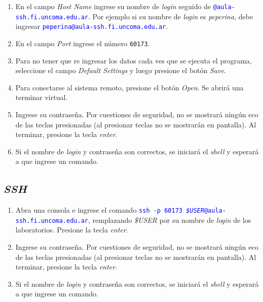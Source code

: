 \documentclass[12pt]{article}
\newcommand{\cw}[1]{\texttt{\textcolor{blue}{#1}}}
\begin{document}
\begin{enumerate}
\begin{figure}[!htb]
\end{figure}


    \item En el campo \emph{Host Name} ingrese su nombre de \emph{login}
        seguido de \cw{@aula-ssh.fi.uncoma.edu.ar}. Por ejemplo si su nombre
        de \emph{login} es \emph{peperina}, debe ingresar
        \cw{peperina@aula-ssh.fi.uncoma.edu.ar}.

    \item En el campo \emph{Port} ingrese el número \texttt{60173}.

    \item Para no tener que re ingresar los datos cada ves que se ejecuta el
        programa, seleccione el campo \emph{Default Settings} y luego presione
        el botón \emph{Save}.

    \item Para conectarse al sistema remoto, presione el botón \emph{Open}. Se
        abrirá una terminar virtual.

    \item Ingrese su contraseña. Por cuestiones de seguridad, no se mostrará
        ningún eco de las teclas presionadas (al presionar teclas no se
        mostrarán en pantalla). Al terminar, presione la tecla 
        \emph{enter}.

    \item Si el nombre de \emph{login} y contraseña son correctos, se iniciará
        el \emph{shell} y esperará a que ingrese un comando.

\end{enumerate}

\subsection*{\emph{SSH}}

\begin{enumerate}

    \item Abra una consola e ingrese el comando \cw{ssh -p 60173
        \emph{\$USER}@aula-ssh.fi.uncoma.edu.ar}, remplazando \emph{\$USER}
        por su nombre de \emph{login} de los laboratorios.  Presione la tecla
        \emph{enter}.

    \item Ingrese su contraseña. Por cuestiones de seguridad, no se mostrará
        ningún eco de las teclas presionadas (al presionar teclas no se
        mostrarán en pantalla). Al terminar, presione la tecla 
        \emph{enter}.

    \item Si el nombre de \emph{login} y contraseña son correctos, se iniciará
        el \emph{shell} y esperará a que ingrese un comando.

\end{enumerate}
\end{document}
